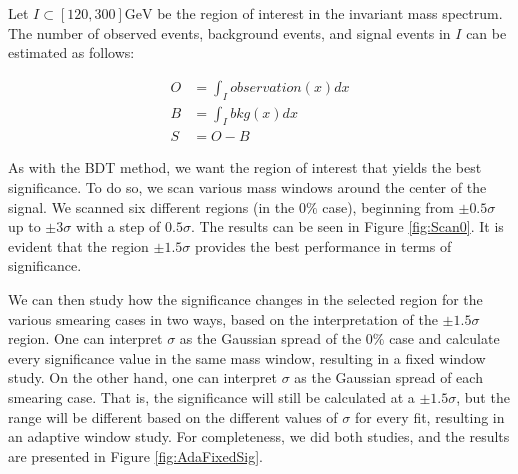 Let \(I\subset [120, 300]\text{GeV}\) be the region of interest in the invariant mass spectrum. The number of observed events, background events, and signal events in \(I\) can be estimated as follows:

\begin{align}
O &= \int_{I} observation(x) dx \\
B &= \int_{I} bkg(x) dx\\
S &= O - B
\end{align}

As with the BDT method, we want the region of interest that yields the best significance. To do so, we scan various mass windows around the center of the signal. We scanned six different regions (in the \(0\%\) case), beginning from \(\pm 0.5\sigma\) up to \(\pm 3\sigma\) with a step of \(0.5\sigma\). The results can be seen in Figure \ref{fig:Scan0}. It is evident that the region \(\pm 1.5\sigma\) provides the best performance in terms of significance.

We can then study how the significance changes in the selected region for the various smearing cases in two ways, based on the interpretation of the \(\pm 1.5\sigma\) region. One can interpret \(\sigma\) as the Gaussian spread of the \(0\%\) case and calculate every significance value in the same mass window, resulting in a fixed window study. On the other hand, one can interpret \(\sigma\) as the Gaussian spread of each smearing case. That is, the significance will still be calculated at a \(\pm 1.5\sigma\), but the range will be different based on the different values of \(\sigma\) for every fit, resulting in an adaptive window study. For completeness, we did both studies, and the results are presented in Figure \ref{fig:AdaFixedSig}.
